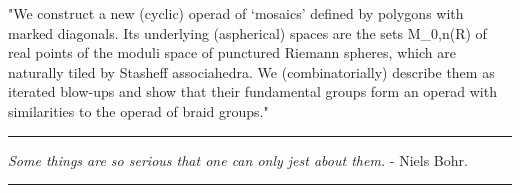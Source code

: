 "We construct a new (cyclic) operad of `mosaics' defined by polygons
with marked diagonals. Its underlying (aspherical) spaces are the sets
M_{0,n}(R) of real points of the moduli space of punctured
Riemann spheres, which are naturally tiled by Stasheff associahedra. 
We (combinatorially) describe them as iterated blow-ups and show that 
their fundamental groups form an operad with similarities to the operad 
of braid groups."


 \par\noindent\rule{\textwidth}{0.4pt}
\emph{Some things are so serious that one can only jest about them.} -
Niels Bohr.
\par\noindent\rule{\textwidth}{0.4pt}

